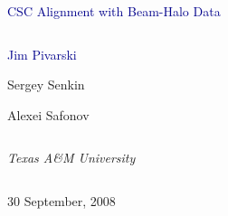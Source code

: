 \documentclass[compress]{beamer}
\begin{document}
\begin{frame}
\vfill
\begin{center}
\textcolor{darkblue}{\Large CSC Alignment with Beam-Halo Data}

\vfill
\begin{columns}
\begin{center}
\large
\textcolor{darkblue}{Jim Pivarski}

\vspace{0.2 cm}
Sergey Senkin

\vspace{0.2 cm}
Alexei Safonov
\end{center}
\end{columns}

\begin{columns}
\begin{center}
\scriptsize
{\it Texas A\&M University}
\end{center}
\end{columns}

\vfill
30 September, 2008

\end{center}
\end{frame}

\end{document}
